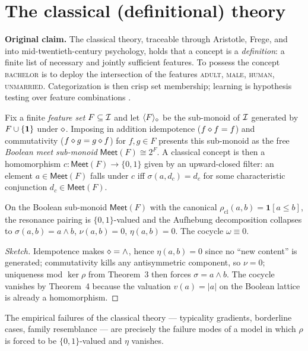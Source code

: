 \section{The classical (definitional) theory}\label{sec:cogsci-classical}

\textbf{Original claim.} The classical theory, traceable through Aristotle,
Frege, and into mid-twentieth-century psychology, holds that a concept is a
\emph{definition}: a finite list of necessary and jointly sufficient
features. To possess the concept \textsc{bachelor} is to deploy the
intersection of the features \textsc{adult}, \textsc{male}, \textsc{human},
\textsc{unmarried}. Categorization is then crisp set membership; learning
is hypothesis testing over feature combinations \citep{Locke1690,Fodor1975}.

\formalclaim Fix a finite \emph{feature set} $F\subseteq\mathcal{I}$ and let
$\langle F\rangle_{\mathbin{\diamond}}$ be the sub-monoid of $\mathcal{I}$ generated by
$F\cup\{\mathbf{1}\}$ under $\mathbin{\diamond}$. Imposing in addition idempotence
($f\mathbin{\diamond} f=f$) and commutativity ($f\mathbin{\diamond} g = g\mathbin{\diamond} f$) for
$f,g\in F$ presents this sub-monoid as the free \emph{Boolean meet
sub-monoid} $\mathsf{Meet}(F)\cong 2^{F}$. A classical concept is then a
homomorphism $c:\mathsf{Meet}(F)\to\{0,1\}$ given by an upward-closed
filter: an element $a\in\mathsf{Meet}(F)$ falls under $c$ iff
$\sigma(a,d_c)=d_c$ for some characteristic conjunction
$d_c\in\mathsf{Meet}(F)$.

\begin{corollary}\label{cor:cogsci-classical}
On the Boolean sub-monoid $\mathsf{Meet}(F)$ with the canonical
$\rho_{\mathrm{cl}}(a,b)=\mathbf{1}[a\le b]$, the resonance pairing is
$\{0,1\}$-valued and the Aufhebung decomposition collapses to
$\sigma(a,b)=a\wedge b$, $\nu(a,b)=0$, $\eta(a,b)=0$. The cocycle
$\omega\equiv 0$.
\end{corollary}

\begin{proof}[Sketch]
Idempotence makes $\mathbin{\diamond}=\wedge$, hence $\eta(a,b)=0$ since no
``new content'' is generated; commutativity kills any antisymmetric
component, so $\nu=0$; uniqueness mod $\ker\rho$ from Theorem~3 then
forces $\sigma=a\wedge b$. The cocycle vanishes by Theorem~4 because the
valuation $v(a)=|a|$ on the Boolean lattice is already a homomorphism.
\end{proof}

The empirical failures of the classical theory --- typicality gradients,
borderline cases, family resemblance \citep{RoschMervis1975} --- are
precisely the failure modes of a model in which $\rho$ is forced to be
$\{0,1\}$-valued and $\eta$ vanishes.

